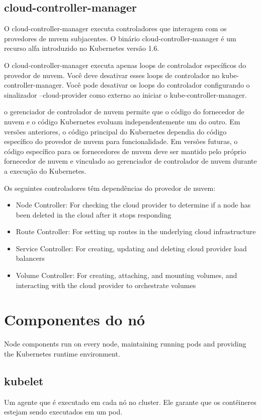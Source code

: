 \subsection{cloud-controller-manager}

O cloud-controller-manager executa controladores que interagem com os provedores de nuvem subjacentes. O binário cloud-controller-manager é um recurso alfa introduzido no Kubernetes versão 1.6.

O cloud-controller-manager executa apenas loops de controlador específicos do provedor de nuvem. Você deve desativar esses loops de controlador no kube-controller-manager. Você pode desativar os loops do controlador configurando o sinalizador --cloud-provider como externo ao iniciar o kube-controller-manager.

o gerenciador de controlador de nuvem permite que o código do fornecedor de nuvem e o código Kubernetes evoluam independentemente um do outro. Em versões anteriores, o código principal do Kubernetes dependia do código específico do provedor de nuvem para funcionalidade. Em versões futuras, o código específico para os fornecedores de nuvem deve ser mantido pelo próprio fornecedor de nuvem e vinculado ao gerenciador de controlador de nuvem durante a execução do Kubernetes.

Os seguintes controladores têm dependências do provedor de nuvem:

\begin{itemize}
	\item Node Controller: For checking the cloud provider to determine if a node has been deleted in the cloud after it stops responding
	\item Route Controller: For setting up routes in the underlying cloud infrastructure
	\item Service Controller: For creating, updating and deleting cloud provider load balancers
	\item Volume Controller: For creating, attaching, and mounting volumes, and interacting with the cloud provider to orchestrate volumes
\end{itemize}

\section{Componentes do nó}

Node components run on every node, maintaining running pods and providing the Kubernetes runtime environment.

\subsection{kubelet}
Um agente que é executado em cada nó no cluster. Ele garante que os contêineres estejam sendo executados em um pod.

